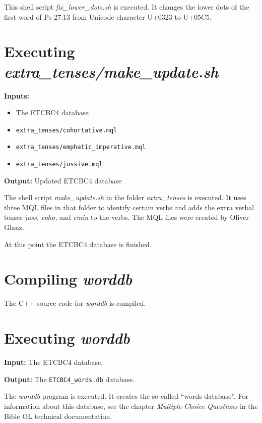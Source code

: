 \documentclass[11pt,oneside,a4paper,article]{memoir}
\begin{document}
This shell script \emph{fix\_lower\_dots.sh} is executed. It changes the lower dots of the first
word of Ps 27:13 from Unicode character U+0323 to U+05C5.


\section{Executing \emph{extra\_tenses/make\_update.sh}}

\noindent \textbf{Inputs:}
\begin{itemize}
\item The ETCBC4 database
\item \texttt{extra\_tenses/cohortative.mql}
\item \texttt{extra\_tenses/emphatic\_imperative.mql}
\item \texttt{extra\_tenses/jussive.mql}
\end{itemize}

\noindent \textbf{Output:} Updated ETCBC4 database

\vspace{1ex}

The shell script \emph{make\_update.sh} in the folder \emph{extra\_tenses} is executed. It uses
three MQL files in that folder to identify certain verbs and adds the extra verbal tenses
\emph{juss, coho,} and \emph{emin} to the verbs. The MQL files were created by Oliver Glanz.

\vspace{1ex}

\noindent
At this point the ETCBC4 database is finished.

\section{Compiling \emph{worddb}}

The C++ source code for \emph{worddb} is compiled.


\section{Executing \emph{worddb}}

\noindent \textbf{Input:} The ETCBC4 database.

\noindent \textbf{Output:} The \texttt{ETCBC4\_words.db} database.

\vspace{1ex}

The \emph{worddb} program is executed. It creates the so-called ``words database''. For information
about this database, see the chapter \emph{Multiple-Choice Questions} in the Bible OL technical
documentation.
\end{document}
